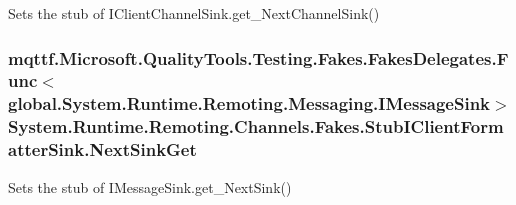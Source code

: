 Sets the stub of I\-Client\-Channel\-Sink.\-get\-\_\-\-Next\-Channel\-Sink()

\hypertarget{class_system_1_1_runtime_1_1_remoting_1_1_channels_1_1_fakes_1_1_stub_i_client_formatter_sink_a625106d365e577e613ccce7f3e61a16a}{
\subsubsection[{Next\-Sink\-Get}]{\setlength{\rightskip}{0pt plus 5cm}mqttf.\-Microsoft.\-Quality\-Tools.\-Testing.\-Fakes.\-Fakes\-Delegates.\-Func$<$global.\-System.\-Runtime.\-Remoting.\-Messaging.\-I\-Message\-Sink$>$ System.\-Runtime.\-Remoting.\-Channels.\-Fakes.\-Stub\-I\-Client\-Formatter\-Sink.\-Next\-Sink\-Get}}\label{class_system_1_1_runtime_1_1_remoting_1_1_channels_1_1_fakes_1_1_stub_i_client_formatter_sink_a625106d365e577e613ccce7f3e61a16a}


Sets the stub of I\-Message\-Sink.\-get\-\_\-\-Next\-Sink()

